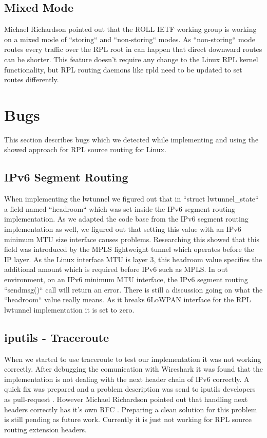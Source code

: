 \documentclass[letterpaper]{article}
\begin{document}
\subsection{Mixed Mode}

Michael Richardson pointed out that the ROLL IETF working group is working on a
mixed mode of ``storing`` and ``non-storing`` modes.
As ``non-storing`` mode routes every traffic over the RPL root in can happen that direct downward routes can be shorter.
This feature doesn't require any change to the Linux RPL kernel functionality, but RPL routing daemons like rpld need to be updated to set routes differently.

\section{Bugs}

This section describes bugs which we detected while implementing and using the showed approach for RPL source routing for Linux.

\subsection{IPv6 Segment Routing}

When implementing the lwtunnel we figured out that in ``struct lwtunnel\_state`` a field named ``headroom`` which was set inside the IPv6 segment routing implementation.
As we adapted the code base from the IPv6 segment routing implementation as
well, we figured out that setting this value with an IPv6 minimum MTU size
interface causes problems. Researching this showed that this field was introduced by the MPLS lightweight tunnel which operates before the IP layer.
As the Linux interface MTU is layer 3, this headroom value specifies the additional amount which is required before IPv6 such as MPLS.
In out environment, on an IPv6 minimum MTU interface, the IPv6 segment routing ``sendmsg()`` call will return an error.
There is still a discussion going on what the ``headroom`` value really means. As it breaks 6LoWPAN interface for the RPL lwtunnel implementation it is set to zero.

\subsection{iputils - Traceroute}

When we started to use traceroute to test our implementation it was not working
correctly. After debugging the comunication with Wireshark it was found that the
implementation is not dealing with the next header chain of IPv6 correctly.
A quick fix was prepared and a problem description was send to iputils
developers as pull-request \cite{iputilspr}. However Michael Richardson pointed out that handling next headers correctly has it's own RFC \cite{RFC7045}.
Preparing a clean solution for this problem  is still pending as future work.
Currently it is just not working for RPL source routing extension headers.



\end{document}
